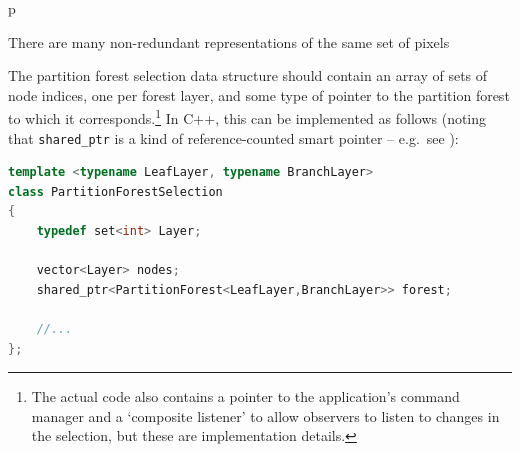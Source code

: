 \begin{stusubfig}{p}
	\hspace{4mm}%
	\hspace{4mm}%
\caption{There are many non-redundant representations of the same set of pixels}
\label{fig:ipfs-selection-multiplerepresentations}
\end{stusubfig}

The partition forest selection data structure should contain an array of sets of node indices, one per forest layer, and some type of pointer to the partition forest to which it corresponds.\footnote{The actual code also contains a pointer to the application's command manager and a `composite listener' to allow observers to listen to changes in the selection, but these are implementation details.} In C++, this can be implemented as follows (noting that \texttt{shared_ptr} is a kind of reference-counted smart pointer -- e.g.~see \cite{btcppsl-sharedptr}):

\begin{lstlisting}[style=Default,language=C++,backgroundcolor={\color[gray]{0.8}}]
template <typename LeafLayer, typename BranchLayer>
class PartitionForestSelection
{
	typedef set<int> Layer;

	vector<Layer> nodes;
	shared_ptr<PartitionForest<LeafLayer,BranchLayer>> forest;

	//...
};
\end{lstlisting}

